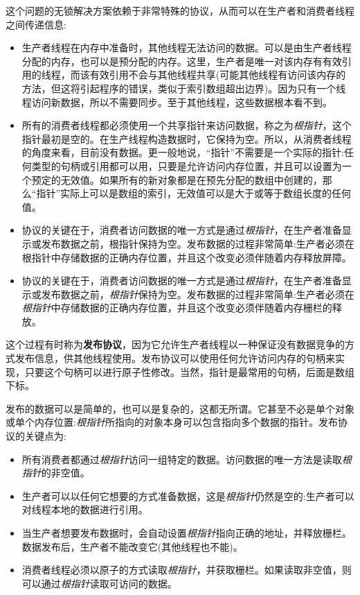 这个问题的无锁解决方案依赖于非常特殊的协议，从而可以在生产者和消费者线程之间传递信息:

\begin{itemize}
\item 
生产者线程在内存中准备时，其他线程无法访问的数据。可以是由生产者线程分配的内存，也可以是预分配的内存。这里，生产者是唯一对该内存有有效引用的线程，而该有效引用不会与其他线程共享(可能其他线程有访问该内存的方法，但这将引起程序的错误，类似于索引数组超出边界)。因为只有一个线程访问新数据，所以不需要同步。至于其他线程，这些数据根本看不到。

\item 
所有的消费者线程都必须使用一个共享指针来访问数据，称之为\textit{根指针}，这个指针最初是空的。在生产线程构造数据时，它保持为空。所以，从消费者线程的角度来看，目前没有数据。更一般地说，“指针”不需要是一个实际的指针:任何类型的句柄或引用都可以用，只要是允许访问内存位置，并且可以设置为一个预定的无效值。如果所有的新对象都是在预先分配的数组中创建的，那么“指针”实际上可以是数组的索引，无效值可以是大于或等于数组长度的任何值。

\item 
协议的关键在于，消费者访问数据的唯一方式是通过\textit{根指针}，在生产者准备显示或发布数据之前，根指针保持为空。发布数据的过程非常简单:生产者必须在根指针中存储数据的正确内存位置，并且这个改变必须伴随着内存释放屏障。

\item 
协议的关键在于，消费者访问数据的唯一方式是通过\textit{根指针}，在生产者准备显示或发布数据之前，\textit{根指针}保持为空。发布数据的过程非常简单:生产者必须在\textit{根指针}中存储数据的正确内存位置，并且这个改变必须伴随着内存栅栏的释放。
\end{itemize}

这个过程有时称为\textbf{发布协议}，因为它允许生产者线程以一种保证没有数据竞争的方式发布信息，供其他线程使用。发布协议可以使用任何允许访问内存的句柄来实现，只要这个句柄可以进行原子性修改。当然，指针是最常用的句柄，后面是数组下标。

发布的数据可以是简单的，也可以是复杂的，这都无所谓。它甚至不必是单个对象或单个内存位置:\textit{根指针}所指向的对象本身可以包含指向多个数据的指针。发布协议的关键点为:

\begin{itemize}
\item
所有消费者都通过\textit{根指针}访问一组特定的数据。访问数据的唯一方法是读取\textit{根指针}的非空值。

\item
生产者可以以任何它想要的方式准备数据，这是\textit{根指针}仍然是空的:生产者可以对线程本地的数据进行引用。

\item 
当生产者想要发布数据时，会自动设置\textit{根指针}指向正确的地址，并释放栅栏。数据发布后，生产者不能改变它(其他线程也不能)。

\item 
消费者线程必须以原子的方式读取\textit{根指针}，并获取栅栏。如果读取非空值，则可以通过\textit{根指针}读取可访问的数据。

\end{itemize}

